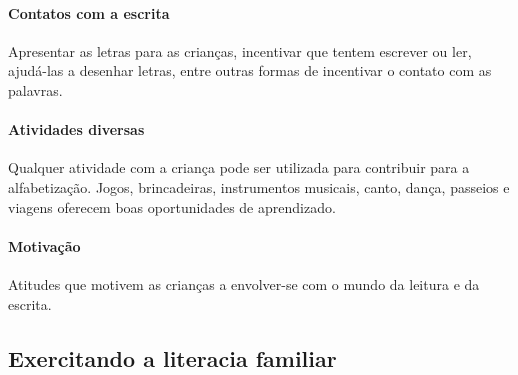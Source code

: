 \documentclass[11pt]{extarticle}
\begin{document}

\paragraph{Contatos com a escrita} Apresentar as letras para as 
crianças, incentivar que tentem escrever ou ler, ajudá-las a desenhar letras, 
entre outras formas de incentivar o contato com as palavras.

\paragraph{Atividades diversas} Qualquer atividade com a criança 
pode ser utilizada para contribuir para a alfabetização. Jogos, brincadeiras, 
instrumentos musicais, canto, dança, passeios e viagens oferecem boas 
oportunidades de aprendizado.

\paragraph{Motivação} Atitudes que motivem as crianças a envolver-se com 
o mundo da leitura e da escrita.

\subsection{Exercitando a literacia familiar}
\end{document}
